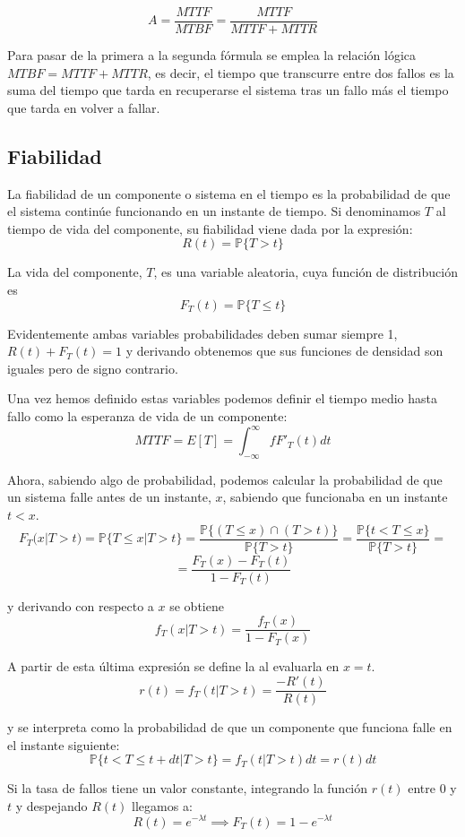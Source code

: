 \[A=\frac{MTTF}{MTBF}=\frac{MTTF}{MTTF+MTTR}\]

Para pasar de la primera a la segunda fórmula se emplea la relación lógica $MTBF=MTTF+MTTR$, es decir, el tiempo que transcurre entre dos fallos es la suma del tiempo que tarda en recuperarse el sistema tras un fallo más el tiempo que tarda en volver a fallar.

\subsection{Fiabilidad}

La fiabilidad de un componente o sistema en el tiempo es la probabilidad de que el sistema continúe funcionando en un instante de tiempo. Si denominamos $T$ al tiempo de vida del componente, su fiabilidad viene dada por la expresión:
\[R(t)=\mathbb{P}\{T > t \}\]

La vida del componente, $T$, es una variable aleatoria, cuya función de distribución es
\[F_T(t)=\mathbb{P}\{T \leq t \}\]

Evidentemente ambas variables probabilidades deben sumar siempre 1, $R(t)+F_T(t)=1$ y derivando obtenemos que sus funciones de densidad son iguales pero de signo contrario.

Una vez hemos definido estas variables podemos definir el tiempo medio hasta fallo como la esperanza de vida de un componente:
\[MTTF = E[T]=\int_{-\infty}^{\infty}fF'_T(t)dt\]

Ahora, sabiendo algo de probabilidad, podemos calcular la probabilidad de que un sistema falle antes de un instante, $x$, sabiendo que funcionaba en un instante $t<x$.
\[F_T(x | T > t ) = \mathbb{P}\{T \leq x | T> t\}=\frac{\mathbb{P}\{(T \leq x) \cap (T > t)\}}{\mathbb{P}\{T > t\}}=\frac{\mathbb{P}\{t < T \leq x\}}{\mathbb{P}\{T > t\}}=\]
\[=\frac{F_T(x)-F_T(t)}{1-F_T(t)}\]

y derivando con respecto a $x$ se obtiene
\[f_T(x | T > t)=\frac{f_T(x)}{1-F_T(x)}\]

A partir de esta última expresión se define la  al evaluarla en $x=t$.
\[r(t)=f_T(t | T > t)=\frac{-R'(t)}{R(t)}\]

y se interpreta como la probabilidad de que un componente que funciona falle en el instante siguiente:
\[\mathbb{P}\{t<T\leq t + dt | T > t\}=f_T(t | T > t)dt=r(t)dt\]

Si la tasa de fallos tiene un valor constante, integrando la función $r(t)$ entre $0$ y $t$ y despejando $R(t)$ llegamos a:
\[R(t)=e^{-λt} \implies F_T(t) = 1-e^{-λt}\]

